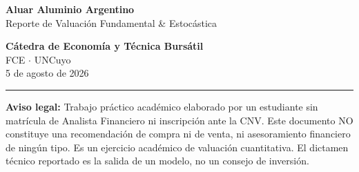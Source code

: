 \documentclass[10pt,a4paper]{article}
\begin{document}
\renewcommand{\topfraction}{0.95}
\renewcommand{\bottomfraction}{0.95}
\renewcommand{\floatpagefraction}{0.85}
\renewcommand{\textfraction}{0.05}

\noindent
\begin{minipage}[b]{0.65\textwidth}
    {\fontsize{24}{28}\selectfont \color{gsnavy} \textbf{Aluar Aluminio Argentino}} \\[0.2cm]
    {\Large \color{gsgray} \textsf{Reporte de Valuaci\'on Fundamental \& Estoc\'astica}}
\end{minipage}%
\begin{minipage}[b]{0.35\textwidth}
    \raggedleft
    {\small \color{gsgray} \textbf{C\'atedra de Econom\'ia y T\'ecnica Burs\'atil}} \\
    {\small \color{gsgray} FCE $\cdot$ UNCuyo} \\
    {\small \color{gsgray} 5 de agosto de 2026}
\end{minipage}

\vspace{0.2cm}
\noindent\textcolor{gsnavy}{\rule{\textwidth}{1.5pt}}
\vspace{0.1cm}

\noindent
{\scriptsize \color{gsgray} \textbf{Aviso legal:} Trabajo pr\'actico acad\'emico elaborado por un estudiante sin matr\'icula de Analista Financiero ni inscripci\'on ante la CNV. Este documento NO constituye una recomendaci\'on de compra ni de venta, ni asesoramiento financiero de ning\'un tipo. Es un ejercicio acad\'emico de valuaci\'on cuantitativa. El dictamen t\'ecnico reportado es la salida de un modelo, no un consejo de inversi\'on.}

\vspace{0.25cm}
\end{document}
